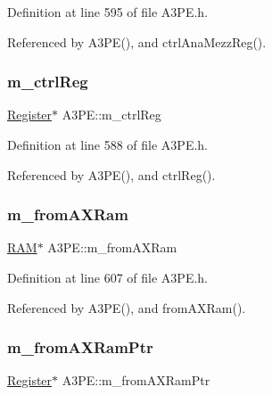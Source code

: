 Definition at line 595 of file A3\+P\+E.\+h.



Referenced by A3\+P\+E(), and ctrl\+Ana\+Mezz\+Reg().

\mbox{\label{classA3PE_a264834484dd6326ebad58c2a3e1be9a6}} 
\subsubsection{\texorpdfstring{m\+\_\+ctrl\+Reg}{m\_ctrlReg}}
{\footnotesize\ttfamily \hyperlink{classRegister}{Register}$\ast$ A3\+P\+E\+::m\+\_\+ctrl\+Reg\hspace{0.3cm}{\ttfamily [private]}}



Definition at line 588 of file A3\+P\+E.\+h.



Referenced by A3\+P\+E(), and ctrl\+Reg().

\mbox{\label{classA3PE_a91d3dd3e87e2c948dd67cb82a63d3858}} 
\subsubsection{\texorpdfstring{m\+\_\+from\+A\+X\+Ram}{m\_fromAXRam}}
{\footnotesize\ttfamily \hyperlink{classRAM}{R\+AM}$\ast$ A3\+P\+E\+::m\+\_\+from\+A\+X\+Ram\hspace{0.3cm}{\ttfamily [private]}}



Definition at line 607 of file A3\+P\+E.\+h.



Referenced by A3\+P\+E(), and from\+A\+X\+Ram().

\mbox{\label{classA3PE_a27ae9467bc128e46dd80443245df096a}} 
\subsubsection{\texorpdfstring{m\+\_\+from\+A\+X\+Ram\+Ptr}{m\_fromAXRamPtr}}
{\footnotesize\ttfamily \hyperlink{classRegister}{Register}$\ast$ A3\+P\+E\+::m\+\_\+from\+A\+X\+Ram\+Ptr\hspace{0.3cm}{\ttfamily [private]}}



